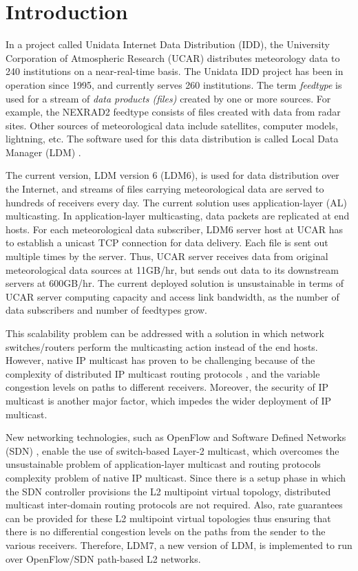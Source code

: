 \chapter{Introduction}
\label{sec:intro}

In a project called Unidata Internet Data Distribution (IDD),
the University Corporation of Atmospheric Research (UCAR)
distributes meteorology data to 240 institutions on a near-real-time basis\cite{IDD}.
The Unidata IDD project has been in operation since 1995, and currently serves 260 institutions.
The term \emph{feedtype} is used for
a stream of \emph{data products (files)} created by one or more
sources. For example, the NEXRAD2 feedtype consists of files created with
data from radar sites. Other sources of meteorological data include
satellites, computer models, lightning, etc.
The software used for this data distribution is called Local Data Manager (LDM) \cite{IDD}. 

The current version, LDM version 6 (LDM6), is used for data distribution over the Internet, and streams of files carrying meteorological data are served to hundreds of receivers every day. The current solution uses application-layer (AL) multicasting. In application-layer multicasting, data packets are
replicated at end hosts. For each meteorological data subscriber, LDM6 server host at UCAR has to establish a unicast TCP connection for data delivery. Each file is sent out multiple times by the server. Thus, UCAR server receives data from original meteorological data sources at 11GB/hr, but sends out data to its downstream servers at 600GB/hr. The current deployed solution is unsustainable in terms of UCAR server computing capacity and access link bandwidth, as the number of data subscribers and number of feedtypes grow.

This scalability problem can be addressed with a solution in which network switches/routers perform the multicasting action instead of the end hosts. However, native IP multicast has proven to be challenging \cite{Ratnasamy:2006:RIM:1159913.1159917} because of the complexity of distributed IP multicast routing protocols \cite{rfc3618}, and the variable congestion levels on paths to different receivers. Moreover, the security of IP multicast \cite{hardjono2000ip} is another major factor, which impedes the wider deployment of IP multicast.

New networking technologies, such as OpenFlow and Software Defined Networks (SDN) \cite{SDNs}, enable the use of switch-based Layer-2 multicast, which overcomes the unsustainable problem of application-layer multicast and routing protocols complexity problem of native IP multicast. Since there is a setup phase in which the SDN controller provisions the L2 multipoint virtual topology, distributed multicast inter-domain routing protocols are not required. Also, rate guarantees can be provided for these L2 multipoint virtual topologies thus ensuring that there is no differential congestion levels on the paths from the sender to the various receivers. Therefore, LDM7, a new version of LDM, is implemented to run over OpenFlow/SDN path-based L2 networks.

